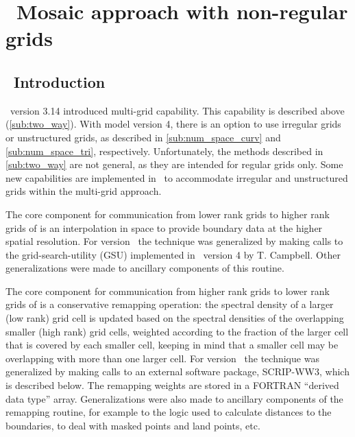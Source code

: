 \pagestyle{myheadings} \setcounter{page}{1} \setcounter{footnote}{0}

\section{~Mosaic approach with non-regular grids} \label{app:scrip}
\newcounters 

\vssub
\subsection{~Introduction} \label{sec:scripA}
\vssub

\noindent
\ws\ version 3.14 \citep{tol:MMAB09a} introduced multi-grid capability. This
capability is described above (\para\ref{sub:two_way}). With model version 4,
there is an option to use irregular grids or unstructured grids, as described
in \para\ref{sub:num_space_curv} and \para\ref{sub:num_space_tri},
respectively. Unfortunately, the methods described in \para\ref{sub:two_way}
are not general, as they are intended for regular grids only. Some new
capabilities are implemented in \WWver\ to accommodate irregular and unstructured
grids within the multi-grid approach.

The core component for communication from lower rank grids to higher rank
grids of \cite{tol:OMOD08b} is an interpolation in space to provide boundary
data at the higher spatial resolution. For version \WWver\, the technique was
generalized by making calls to the grid-search-utility (GSU) implemented in
\ws\ version 4 by T. Campbell. Other generalizations were made to ancillary
components of this routine.

The core component for communication from higher rank grids to lower rank
grids of \cite{tol:OMOD08b} is a conservative remapping operation: the
spectral density of a larger (low rank) grid cell is updated based on the
spectral densities of the overlapping smaller (high rank) grid cells, weighted
according to the fraction of the larger cell that is covered by each smaller
cell, keeping in mind that a smaller cell may be overlapping with more than
one larger cell. For version \WWver\, the technique was generalized by making calls to
an external software package, SCRIP-WW3, which is described below. The
remapping weights are stored in a FORTRAN ``derived data type''
array. Generalizations were also made to ancillary components of the remapping
routine, for example to the logic used to calculate distances to the
boundaries, to deal with masked points and land points, etc.

